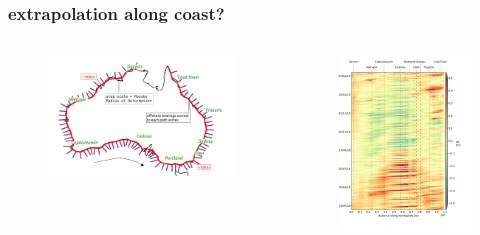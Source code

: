 \begin{frame}
\frametitle{extrapolation along coast?}
\begin{columns}
    \begin{column}{0.5\textwidth}
      \begin{figure}      
        \includegraphics[width=\textwidth]{figures/maps/map_overview.png}
      \end{figure}
    \end{column}

    \begin{column}{0.5\textwidth}
      \begin{figure}      
        \includegraphics[width=\textwidth]{figures/plots/concat_sla_day0_full.png}
      \end{figure}
    \end{column}
\end{columns}
\end{frame}
